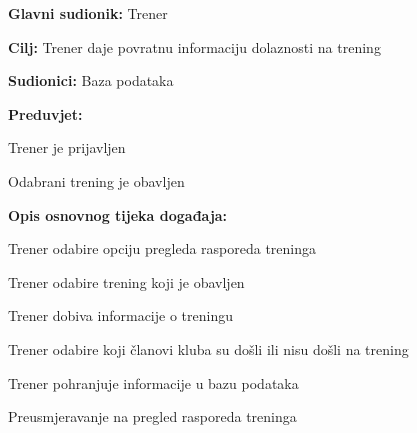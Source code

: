 \documentclass[times, utf8, zavrsni]{fer}
\newenvironment{packed_enum}{
	\begin{enumerate}
		\setlength{\itemsep}{0pt}
		\setlength{\parskip}{0pt}
		\setlength{\parsep}{0pt}
	}{\end{enumerate}}
\newenvironment{packed_item}{
	\begin{itemize}
		\setlength{\itemsep}{0pt}
		\setlength{\parskip}{0pt}
		\setlength{\parsep}{0pt}
	}{\end{itemize}}
\begin{document}
		    \noindent {}
					\begin{packed_item}
						
						\item \textbf{Glavni sudionik: } Trener
						\item  \textbf{Cilj:} Trener daje povratnu informaciju dolaznosti na trening
						\item  \textbf{Sudionici:} Baza podataka
						\item  \textbf{Preduvjet:} 
						
						\item[] \begin{packed_enum}
							
							\item Trener je prijavljen
							\item Odabrani trening je obavljen
							
							
						\end{packed_enum}
						
						\item  \textbf{Opis osnovnog tijeka događaja:}
						
						\item[] \begin{packed_enum}
							
							\item Trener odabire opciju pregleda rasporeda treninga
							\item Trener odabire trening koji je obavljen
							\item Trener dobiva informacije o treningu
							\item Trener odabire koji članovi kluba su došli ili nisu došli na trening
							\item Trener pohranjuje informacije u bazu podataka
							\item Preusmjeravanje na pregled rasporeda treninga
							
							
						\end{packed_enum}
						
					\end{packed_item}
					
\end{document}
